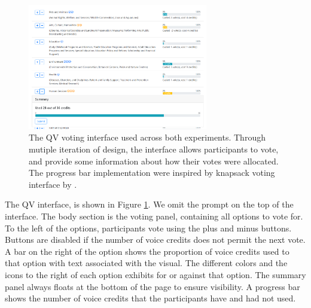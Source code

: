 \begin{figure}[htpb]
    \centering
    \includegraphics[width=0.7\textwidth, keepaspectratio=true]{content/image/qv-donation.png}
    \caption{
        The QV voting interface used across both experiments. Through mutiple iteration of design, the interface allows participants to vote, and provide some information about how their votes were allocated. The progress bar implementation were inspired by knapsack voting interface by \textcite{goel2015knapsack}.
    }
    \label{fig:qv_donation}
\end{figure}

The QV interface, is shown in Figure \ref{fig:qv_donation}.
We omit the prompt on the top of the interface.
The body section is the voting panel, containing all options to vote for.
To the left of the options, participants vote using the plus and minus buttons.
Buttons are disabled if the number of voice credits does not permit the next vote.
A bar on the right of the option shows the proportion of voice credits used to that option with text associated with the visual.
The different colors and the icons to the right of each option exhibits for or against that option.
The summary panel always floats at the bottom of the page to ensure visibility.
A progress bar shows the number of voice credits that the participants have and had not used.\par